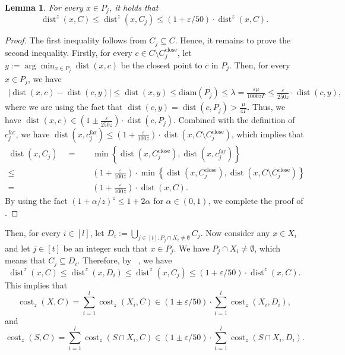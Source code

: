\documentclass[letterpaper,11pt]{article}
\theoremstyle{plain}
\newtheorem{lemma}[theorem]{Lemma}
\theoremstyle{definition}
\theoremstyle{remark}
\DeclareMathOperator{\cost}{cost}
\DeclareMathOperator{\dist}{dist}
\newcommand{\diam}{\mathrm{diam}}
\newcommand{\far}{\mathrm{far}}
\newcommand{\close}{\mathrm{close}}
\newcommand{\eps}{\varepsilon}
\begin{document}
\begin{lemma}
\label{claim:C_j}
For every $x\in P_j$, it holds that 
\begin{equation*}
    \dist^z(x,C)\le \dist^z(x, C_j)\le (1+\eps/50)\cdot \dist^z(x,C).
\end{equation*}
\end{lemma}
\begin{proof}
The first inequality follows from $C_j\subseteq C$. Hence, it remains to prove the second inequality. Firstly, for every $c\in C\setminus C_j^\close$, let $y:=\arg\min_{x\in P_j} \dist(x,c)$ be the closest point to $c$ in $P_j$. Then, for every $x\in P_j$, we have 
\begin{align*}
    \left|\dist(x,c) - \dist(c,y)\right|\le \dist(x,y)\le \diam(P_j)\le\lambda = \frac{\eps\mu}{1000z\Gamma} \le \frac{\eps}{250z} \cdot \dist(c,y),
\end{align*}
where we are using the fact that $\dist(c,y) = \dist(c,P_j)> \frac{\mu}{4\Gamma}$. Thus, we have $\dist(x,c) \in (1\pm \frac{\eps}{250z})\cdot \dist(c,P_j)$. Combined with the definition of $c_j^\far$, we have $\dist(x,c_j^\far)\le (1+\frac{\eps}{100z})\cdot \dist(x,C\setminus C_j^\close)$, which implies that
\begin{align*}
    \dist(x,C_j) \quad = &\quad  \min\left\{\dist(x,C_j^\close), \dist(x,c_j^\far)\right\} \\
    \le&\quad \left(1+\frac{\eps}{100z}\right)\cdot\min\left\{\dist(x,C_j^\close), \dist(x,C\setminus C_j^\close)\right\}\\
    =&\quad \left(1+\frac{\eps}{100z}\right)\cdot \dist(x,C).
\end{align*}
By using the fact $(1+\alpha/z)^z \le 1 + 2\alpha$ for $\alpha\in (0,1)$, we complete the proof of .
\end{proof}

Then, for every $i\in [l]$, let $D_i:=\bigcup_{j\in [t]: P_j\cap X_i\neq \emptyset} C_j$.
Now consider any $x\in X_i$ and let $j\in [t]$ be an integer such that $x\in P_j$. We have $P_j\cap X_i\neq \emptyset$, which means that $C_j\subseteq D_i$. Therefore, by ~, we have
\begin{equation}
\label{eq:Di}
\dist^z(x,C)\le \dist^z(x,D_i)\le \dist^z(x,C_j)\le (1+\eps/50)\cdot \dist^z(x,C).
\end{equation}
This implies that 
\begin{equation}
\label{eq:cost P_i}
\cost_z(X,C) = \sum_{i=1}^l \cost_z(X_i,C) \in (1\pm\eps/50)\cdot \sum_{i=1}^l\cost_z(X_i,D_i),
\end{equation}
and
\begin{equation}
\label{eq:cost S_X}
\cost_z(S,C) = \sum_{i=1}^l\cost_z(S\cap X_i,C)\in (1\pm \eps/50)\cdot \sum_{i=1}^l\cost_z(S\cap X_i,D_i).
\end{equation}
\end{document}
